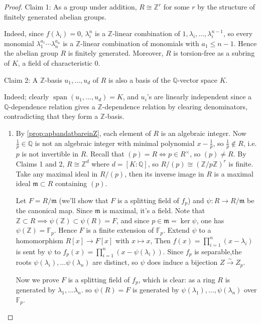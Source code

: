 \documentclass{article}
\newcommand{\F}{\mathbb{F}}
\newcommand{\Z}{\mathbb{Z}}
\newcommand{\Q}{\mathbb{Q}}
\newcommand{\Span}{\operatorname{span}}
\theoremstyle{definition}
\begin{document}
\begin{proof}
Claim 1: As a group under addition, $R\cong\Z^r$ for some $r$ by the structure of finitely generated abelian groups.

Indeed, since $f(\lambda_i)=0$, $\lambda_i^n$ is a $\Z$-linear combination of $1,\lambda_i,\ldots,\lambda_i^{n-1}$, so every monomial $\lambda_1^{a_1}\cdots\lambda_n^{a_n}$ is a $\Z$-linear combination of monomials with $a_1\leq n-1$. Hence the abelian group $R$ is finitely generated. Moreover, $R$ is torsion-free as a subring of $K$, a field of characteristic 0.

Claim 2: A $\Z$-basis $u_1,\ldots,u_d$ of $R$ is also a basis of the $\Q$-vector space $K$.

Indeed; clearly $\Span(u_1,\ldots,u_d)=K$, and $u_i$'s are linearly independent since a $\Q$-dependence relation gives a $\Z$-dependence relation by clearing denominators, contradicting that they form a $\Z$-basis.

\begin{enumerate}
\item By \ref{prop:apbandatbareinZ}, each element of $R$ is an algebraic integer. Now $\frac{1}{p}\in\Q$ is not an algebraic integer with minimal polynomial $x-\frac1p$, so $\frac1p\notin R$, i.e. $p$ is not invertible in $R$. Recall that $(p)=R\iff p\in R^\times$, so $(p)\neq R$. By Claims 1 and 2, $R\cong\Z^d$ where $d=[K:\Q]$, so $R/(p)\cong (\Z/p\Z)^r$ is finite. Take any maximal ideal in $R/(p)$, then its inverse image in $R$ is a maximal ideal $\mathfrak m\subset R$ containing $(p)$.

Let $F=R/\mathfrak m$ (we'll show that $F$ is a splitting field of $f_p$) and $\psi:R\rightarrow R/\mathfrak m$ be the canonical map. Since $\mathfrak m$ is maximal, it's a field. Note that $\Z\subset R\implies\psi(\Z)\subset\psi(R)=F$, and since $p\in\mathfrak m=\ker\psi$, one has $\psi(\Z)=\F_p$. Hence $F$ is a finite extension of $\F_p$. Extend $\psi$ to a homomorphism $R[x]\rightarrow F[x]$ with $x\mapsto x$, Then $f(x)=\prod_{i=1}^n(x-\lambda_i)$ is sent by $\psi$ to $f_p(x)=\prod_{i=1}^n(x-\psi(\lambda_i))$. Since $f_p$ is separable,the roots $\psi(\lambda_i),\ldots\psi(\lambda_n)$ are distinct, so $\psi$ does induce a bijection $Z\xrightarrow{\sim}Z_p$.

Now we prove $F$ is a splitting field of $f_p$, which is clear: as a ring $R$ is generated by $\lambda_1,\ldots\lambda_n$. so $\psi(R)=F$ is generated by $\psi(\lambda_1),\ldots,\psi(\lambda_n)$ over $\F_p$.


\end{enumerate}
\end{proof}
\end{document}
